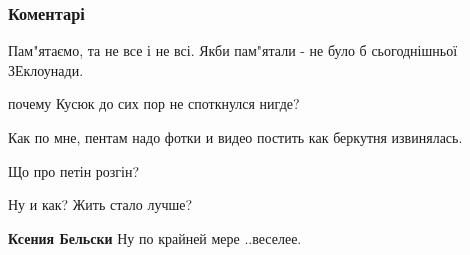  
 
 
 
 
\subsubsection{Коментарі}
\label{sec:30_11_2021.fb.bereza_borislav.1.berkut_evromaidan.cmt}

\begin{itemize} %
Пам"ятаємо, та не все і не всі. Якби пам"ятали - не було б сьогоднішньої ЗЕклоунади.

почему Кусюк до сих пор не споткнулся нигде?

Как по мне, пентам надо фотки и видео постить как беркутня извинялась.

Що про петін розгін?

Ну и как? Жить стало лучше?

\textbf{Ксения Бельски} Ну по крайней мере ..веселее.
\end{itemize} %
